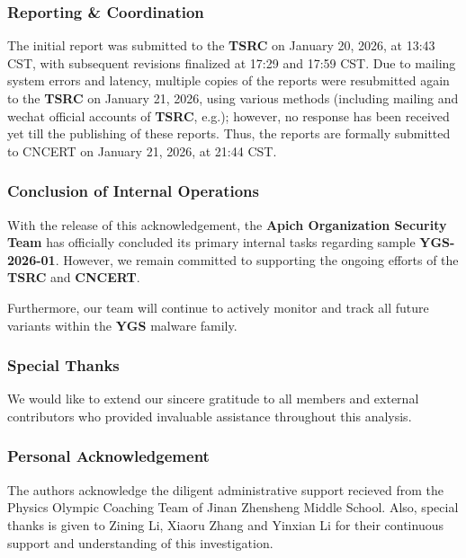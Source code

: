\documentclass[
]{article}
\begin{document}
\subsubsection{\texorpdfstring{\textbf{Reporting \&
Coordination}}{Reporting \& Coordination}}\label{reporting--coordination}

The initial report was submitted to the \textbf{TSRC} on January 20,
2026, at 13:43 CST, with subsequent revisions finalized at 17:29 and
17:59 CST. Due to mailing system errors and latency, multiple copies of
the reports were resubmitted again to the \textbf{TSRC} on January 21,
2026, using various methods (including mailing and wechat official
accounts of \textbf{TSRC}, e.g.); however, no response has been received
yet till the publishing of these reports. Thus, the reports are formally
submitted to CNCERT on January 21, 2026, at 21:44 CST.

\subsubsection{\texorpdfstring{\textbf{Conclusion of Internal
Operations}}{Conclusion of Internal Operations}}\label{conclusion-of-internal-operations}

With the release of this acknowledgement, the \textbf{Apich Organization
Security Team} has officially concluded its primary internal tasks
regarding sample \textbf{YGS-2026-01}. However, we remain committed to
supporting the ongoing efforts of the \textbf{TSRC} and \textbf{CNCERT}.

Furthermore, our team will continue to actively monitor and track all
future variants within the \textbf{YGS} malware family.

\subsubsection{\texorpdfstring{\textbf{Special
Thanks}}{Special Thanks}}\label{special-thanks}

We would like to extend our sincere gratitude to all members and
external contributors who provided invaluable assistance throughout this
analysis.

\subsubsection{\texorpdfstring{\textbf{Personal
Acknowledgement}}{Personal Acknowledgement}}\label{personal-acknowledgement}

The authors acknowledge the diligent administrative support recieved
from the Physics Olympic Coaching Team of Jinan Zhensheng Middle School.
Also, special thanks is given to Zining Li, Xiaoru Zhang and Yinxian Li
for their continuous support and understanding of this investigation.
\end{document}
